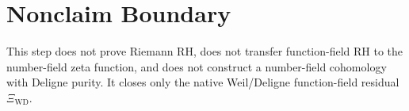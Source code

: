\documentclass[11pt]{article}
\newcommand{\XiWD}{\Xi_{\mathrm{WD}}}
\begin{document}
\section*{Nonclaim Boundary}

This step does not prove Riemann RH, does not transfer function-field RH to
the number-field zeta function, and does not construct a number-field
cohomology with Deligne purity.  It closes only the native Weil/Deligne
function-field residual \(\XiWD\).
\end{document}
